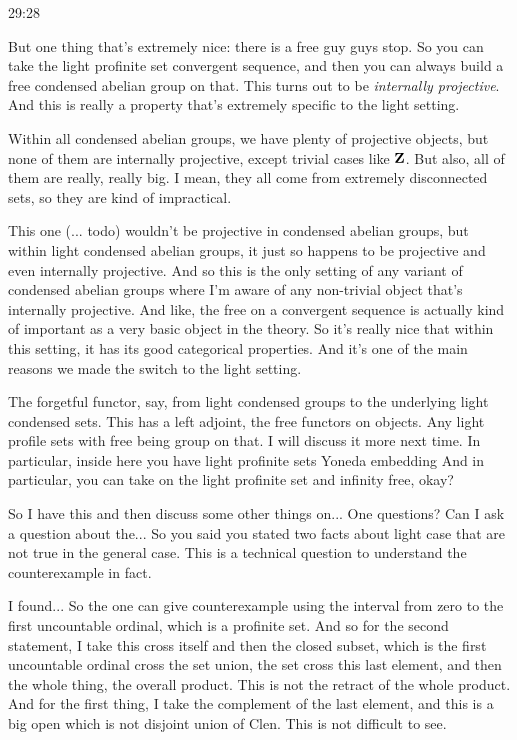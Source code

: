 \begin{example}
\begin{unfinished}{29:28}
\begin{remark}
\begin{remark}
But one thing that's extremely nice: there is a free guy guys stop. So you can take the light profinite set convergent sequence, and then you can always build a free condensed abelian group on that. This turns out to be \emph{internally projective}. And this is really a property that's extremely specific to the light setting.

Within all condensed abelian groups, we have plenty of projective objects, but none of them are internally projective, except trivial cases like $\mathbf Z$. But also, all of them are really, really big. I mean, they all come from extremely disconnected sets, so they are kind of impractical.

This one (\Z ... todo) wouldn't be projective in condensed abelian groups, but within light condensed abelian groups, it just so happens to be projective and even internally projective. And so this is the only setting of any variant of condensed abelian groups where I'm aware of any non-trivial object that's internally projective. And like, the free  on a convergent sequence is actually kind of important as a very basic object in the theory. So it's really nice that within this setting, it has its good categorical properties. And it's one of the main reasons we made the switch to the light setting.

The forgetful functor, say, from light condensed groups to the underlying light condensed sets. This has a left adjoint, the free functors on objects. Any light profile sets with free being group on that. I will discuss it more next time. 
In particular, inside here you have light profinite sets Yoneda embedding  And in particular, you can take on the light profinite set and infinity free, okay?

So I have this and then discuss some other things on... One questions? Can I ask a question about the... So you said you stated two facts about light case that are not true in the general case. This is a technical question to understand the counterexample in fact.

I found... So the one can give counterexample using the interval from zero to the first uncountable ordinal, which is a profinite set. And so for the second statement, I take this cross itself and then the closed subset, which is the first uncountable ordinal cross the set union, the set cross this last element, and then the whole thing, the overall product. This is not the retract of the whole product. And for the first thing, I take the complement of the last element, and this is a big open which is not disjoint union of Clen. This is not difficult to see.


\end{remark}
\end{remark}
\end{unfinished}
\end{example}
